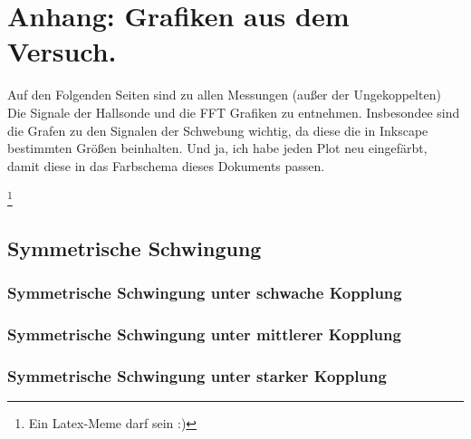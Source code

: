 \chapter[Anhang]{Anhang: Grafiken aus dem Versuch.}
\label{ch:Anhang}

Auf den Folgenden Seiten sind zu allen Messungen (außer der Ungekoppelten) Die Signale der Hallsonde und die FFT  Grafiken zu entnehmen. Insbesondee sind die Grafen zu den Signalen der Schwebung wichtig, da diese die in Inkscape bestimmten Größen beinhalten. 
Und ja, ich habe jeden Plot neu eingefärbt, damit diese in das Farbschema dieses Dokuments passen.

\footnote{Ein Latex-Meme darf sein :)}


\twocolumn
\onecolumn
\section{Symmetrische Schwingung}

\subsection[Schwache Kopplung]{Symmetrische Schwingung unter schwache Kopplung}


\twocolumn
\onecolumn
\subsection[Mittlere Kopplung]{Symmetrische Schwingung unter mittlerer Kopplung}


\twocolumn
\onecolumn
\subsection[Starke Kopplung]{Symmetrische Schwingung unter starker Kopplung}

